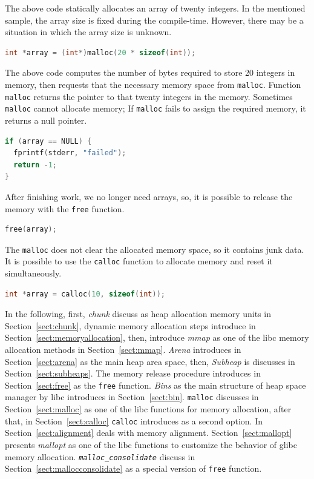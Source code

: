 \documentclass{masterthesis}
\newcommand*\libc{glibc}
\newcommand*\mallocc{\lstinline{malloc}\xspace}
\newcommand*\callocc{\lstinline{calloc}\xspace}
\newcommand{\refToSection}[1]{Section~\ref{sect:#1}\xspace}
\begin{document}
The above code statically allocates an array of twenty integers. In the mentioned sample, the array size is fixed during the compile-time. However, there may be a situation in which the array size is unknown.
\begin{lstlisting}[language=c,frame=tlrb]
int *array = (int*)malloc(20 * sizeof(int));
\end{lstlisting}
The above code computes the number of bytes required to store 20 integers in memory, then requests that the necessary memory space from \mallocc{}. Function \mallocc{} returns the pointer to that twenty integers in the memory. Sometimes \mallocc{} cannot allocate memory; If \mallocc{} fails to assign the required memory, it returns a null pointer.
\begin{lstlisting}[language=c,frame=tlrb]
if (array == NULL) {
  fprintf(stderr, "failed");
  return -1;
}
\end{lstlisting}
After finishing work, we no longer need arrays, so, it is possible to release the memory with the \lstinline{free} function.
\begin{lstlisting}[language=c,frame=tlrb]
free(array);
\end{lstlisting}
The \mallocc{} does not clear the allocated memory space, so it contains junk data. It is possible to use the \callocc{} function to allocate memory and reset it simultaneously.
\begin{lstlisting}[language=c,frame=tlrb]
int *array = calloc(10, sizeof(int));
\end{lstlisting}
In the following, first, \emph{chunk} discuss as heap allocation memory units in \refToSection{chunk}, dynamic memory allocation steps introduce in \refToSection{memoryallocation}, then, introduce \emph{mmap} as one of the libc memory allocation methods in \refToSection{mmap}.  \emph{Arena} introduces in \refToSection{arena} as the main heap area space, then, \emph{Subheap} is discusses in \refToSection{subheaps}. The memory release procedure introduces in \refToSection{free} as the \lstinline{free} function. \emph{Bins} as the main structure of heap space manager by libc introduces in \refToSection{bin}. \lstinline{malloc} discusses in \refToSection{malloc}  as one of the libc functions for memory allocation, after that, in \refToSection{calloc} \lstinline{calloc} introduces as a second option.  In \refToSection{alignment} deals with memory alignment. \refToSection{mallopt} presents \emph{mallopt} as one of the libc functions to customize the behavior of \libc{} memory allocation. \emph{\lstinline{malloc_consolidate}} discuss in \refToSection{mallocconsolidate}  as a special version of \lstinline{free} function.
\end{document}
